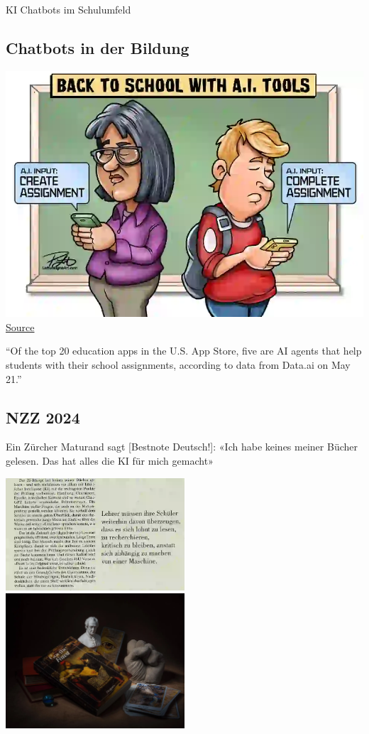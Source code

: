\documentclass[
  letterpaper,
  DIV=11,
  numbers=noendperiod]{scrartcl}
\begin{document}
KI Chatbots im Schulumfeld

\subsection{Chatbots in der Bildung}\label{chatbots-in-der-bildung}

\includegraphics[width=1\textwidth,height=\textheight]{images/2847_cartoon_back_to_school_1.webp}
\href{https://www.prpeak.com/opinion/cartoon-homework-assignments-7489368}{Source}

``Of the top 20 education apps in the U.S. App Store, five are AI agents
that help students with their school assignments, according to data from
Data.ai on May 21.''

\subsection{NZZ 2024}\label{nzz-2024}

Ein Zürcher Maturand sagt {[}Bestnote Deutsch!{]}: «Ich habe keines
meiner Bücher gelesen. Das hat alles die KI für mich gemacht»

\includegraphics[width=0.5\textwidth,height=\textheight]{images/NZZ Deutsch Matur.webp}
\includegraphics[width=0.5\textwidth,height=\textheight]{images/NZZ Faust.webp}
\end{document}
